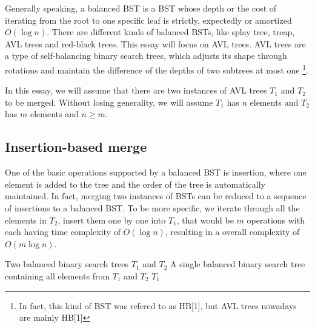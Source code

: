 \documentclass[12pt]{article}
\begin{document}
Generally speaking, a balanced BST is a BST whose depth or the cost of iterating from the root to one specific leaf is strictly, expectedly or amortized $O(\log n)$. There are different kinds of balanced BSTs, like splay tree, treap, AVL trees and red-black trees. This essay will focus on AVL trees. AVL trees are a type of self-balancing binary search trees, which adjusts its shape through rotations and maintain the difference of the depths of two subtrees at most one \cite{avl}\footnote{In fact, this kind of BST was refered to as HB[1], but AVL trees nowadays are mainly HB[1]}. 


In this essay, we will assume that there are two instances of AVL trees $T_1$ and $T_2$ to be merged. Without losing generality, we will assume $T_1$ has $n$ elements and $T_2$ has $m$ elements and $n \ge m$.



\subsection{Insertion-based merge}

One of the basic operations supported by a balanced BST is insertion, where one element is added to the tree and the order of the tree is automatically maintained. In fact, merging two instances of BSTs can be reduced to a sequence of insertions to a balanced BST. To be more specific, we iterate through all the elements in $T_2$, insert them one by one into $T_1$, that would be $m$ operations with each having time complexity of $O(\log n)$, resulting in a overall complexity of $O(m\log n)$. 

\begin{tcolorbox}[colback=blue!5!white, colframe=blue!75!black, title=Algorithm: Insertion-Based Merge]
\begin{algorithmic}[1]
\Require Two balanced binary search trees $T_1$ and $T_2$
\Ensure A single balanced binary search tree containing all elements from $T_1$ and $T_2$
        \State {}
    \EndFor
    \State \Return $T_1$
\EndProcedure
\end{algorithmic}
\end{tcolorbox}
\end{document}
